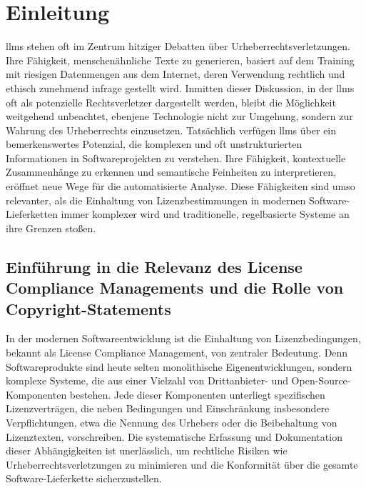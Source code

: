 \chapter{Einleitung}\label{ch:einleitung}

\glspl{llm} stehen oft im Zentrum hitziger Debatten über Urheberrechtsverletzungen.
Ihre Fähigkeit, menschenähnliche Texte zu generieren, basiert auf dem Training mit riesigen Datenmengen aus dem Internet, deren Verwendung rechtlich und ethisch zunehmend infrage gestellt wird.
Inmitten dieser Diskussion, in der \glspl{llm} oft als potenzielle Rechtsverletzer dargestellt werden, bleibt die Möglichkeit weitgehend unbeachtet, ebenjene Technologie nicht zur Umgehung, sondern zur Wahrung des Urheberrechts einzusetzen.
Tatsächlich verfügen \glspl{llm} über ein bemerkenswertes Potenzial, die komplexen und oft unstrukturierten Informationen in Softwareprojekten zu verstehen.
Ihre Fähigkeit, kontextuelle Zusammenhänge zu erkennen und semantische Feinheiten zu interpretieren, eröffnet neue Wege für die automatisierte Analyse.
Diese Fähigkeiten sind umso relevanter, als die Einhaltung von Lizenzbestimmungen in modernen Software-Lieferketten immer komplexer wird und traditionelle, regelbasierte Systeme an ihre Grenzen stoßen.


\section{Einführung in die Relevanz des License Compliance Managements und die Rolle von Copyright-Statements}\label{sec:einfuhrung}

In der modernen Softwareentwicklung ist die Einhaltung von Lizenzbedingungen, bekannt als License Compliance Management, von zentraler Bedeutung.
Denn Softwareprodukte sind heute selten monolithische Eigenentwicklungen, sondern komplexe Systeme, die aus einer Vielzahl von Drittanbieter- und Open-Source-Komponenten bestehen.
Jede dieser Komponenten unterliegt spezifischen Lizenzverträgen, die neben Bedingungen und Einschränkung insbesondere Verpflichtungen, etwa die Nennung des Urhebers oder die Beibehaltung von Lizenztexten, vorschreiben.
Die systematische Erfassung und Dokumentation dieser Abhängigkeiten ist unerlässlich, um rechtliche Risiken wie Urheberrechtsverletzungen zu minimieren und die Konformität über die gesamte Software-Lieferkette sicherzustellen.

